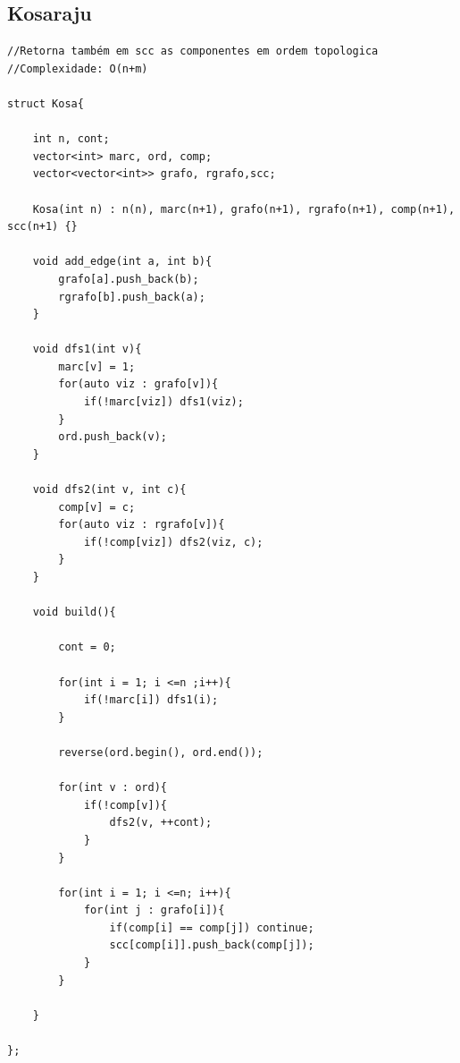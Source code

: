 \documentclass[11pt, a4paper, twoside]{article}
\begin{document}
\subsection{Kosaraju}
\begin{verbatim}
//Retorna também em scc as componentes em ordem topologica 
//Complexidade: O(n+m)

struct Kosa{
    
    int n, cont;
    vector<int> marc, ord, comp;
    vector<vector<int>> grafo, rgrafo,scc;
    
    Kosa(int n) : n(n), marc(n+1), grafo(n+1), rgrafo(n+1), comp(n+1), scc(n+1) {} 
    
    void add_edge(int a, int b){
        grafo[a].push_back(b);
        rgrafo[b].push_back(a);
    }
    
    void dfs1(int v){   
        marc[v] = 1;
        for(auto viz : grafo[v]){
            if(!marc[viz]) dfs1(viz);
        }
        ord.push_back(v);
    }
    
    void dfs2(int v, int c){
        comp[v] = c;
        for(auto viz : rgrafo[v]){
            if(!comp[viz]) dfs2(viz, c);
        } 
    }
    
    void build(){
    
        cont = 0;
    
        for(int i = 1; i <=n ;i++){
            if(!marc[i]) dfs1(i);
        }
    
        reverse(ord.begin(), ord.end());
    
        for(int v : ord){
            if(!comp[v]){
                dfs2(v, ++cont);
            }
        }
    
        for(int i = 1; i <=n; i++){
            for(int j : grafo[i]){
                if(comp[i] == comp[j]) continue;
                scc[comp[i]].push_back(comp[j]);
            }
        }
    
    }
    
};
\end{verbatim}
\end{document}
